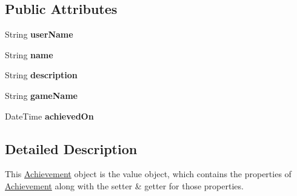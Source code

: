 \subsection*{Public Attributes}
\begin{DoxyCompactItemize}
\item 
\hypertarget{classcom_1_1shephertz_1_1app42_1_1paas_1_1sdk_1_1windows_1_1achievement_1_1_achievement_a7dd69f6dc7a0d3c3ae2f72b4c25fd086}{String {\bfseries user\+Name}}\label{classcom_1_1shephertz_1_1app42_1_1paas_1_1sdk_1_1windows_1_1achievement_1_1_achievement_a7dd69f6dc7a0d3c3ae2f72b4c25fd086}

\item 
\hypertarget{classcom_1_1shephertz_1_1app42_1_1paas_1_1sdk_1_1windows_1_1achievement_1_1_achievement_a430efc870f87604ab78bb2b1df957a08}{String {\bfseries name}}\label{classcom_1_1shephertz_1_1app42_1_1paas_1_1sdk_1_1windows_1_1achievement_1_1_achievement_a430efc870f87604ab78bb2b1df957a08}

\item 
\hypertarget{classcom_1_1shephertz_1_1app42_1_1paas_1_1sdk_1_1windows_1_1achievement_1_1_achievement_ad4b5ac5d55a8022f173f9c470e34d467}{String {\bfseries description}}\label{classcom_1_1shephertz_1_1app42_1_1paas_1_1sdk_1_1windows_1_1achievement_1_1_achievement_ad4b5ac5d55a8022f173f9c470e34d467}

\item 
\hypertarget{classcom_1_1shephertz_1_1app42_1_1paas_1_1sdk_1_1windows_1_1achievement_1_1_achievement_abc309de5c3acaa5236815f487a610bac}{String {\bfseries game\+Name}}\label{classcom_1_1shephertz_1_1app42_1_1paas_1_1sdk_1_1windows_1_1achievement_1_1_achievement_abc309de5c3acaa5236815f487a610bac}

\item 
\hypertarget{classcom_1_1shephertz_1_1app42_1_1paas_1_1sdk_1_1windows_1_1achievement_1_1_achievement_a11848d2a81a717b37873985a737bdd33}{Date\+Time {\bfseries achieved\+On}}\label{classcom_1_1shephertz_1_1app42_1_1paas_1_1sdk_1_1windows_1_1achievement_1_1_achievement_a11848d2a81a717b37873985a737bdd33}

\end{DoxyCompactItemize}


\subsection{Detailed Description}
This \hyperlink{classcom_1_1shephertz_1_1app42_1_1paas_1_1sdk_1_1windows_1_1achievement_1_1_achievement}{Achievement} object is the value object, which contains the properties of \hyperlink{classcom_1_1shephertz_1_1app42_1_1paas_1_1sdk_1_1windows_1_1achievement_1_1_achievement}{Achievement} along with the setter \& getter for those properties. 



